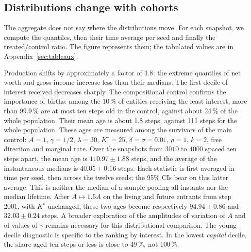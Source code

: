 \subsection{Distributions change with cohorts}\label{sec:ou}
The aggregate does not say where the distributions move. For each
snapshot, we compute the quantiles, then their time average per seed
and finally the treated/control ratio. The figure represents them; the
tabulated values are in Appendix~\ref{sec:tableaux}.


Production shifts by approximately a factor of 1.8; the extreme
quantiles of net worth and gross income increase less than their
medians. The first decile of interest received decreases sharply. The
compositional control confirms the importance of births: among the
10\,\% of entities receiving the least interest, more than 99.9\,\% are
at most ten steps old in the control, against about 24\,\% of the whole
population. Their mean age is about 1.8 steps, against 111 steps for
the whole population. These ages are measured among the survivors of
the main control: $A=1$, $\gamma=1/2$, $\lambda=30$, $K^\circ=25$,
$\delta=\sigma=0.01$, $\rho=1$, $k=2$, free direction and marginal rate.
Over the snapshots from $3010$ to $4000$ spaced ten steps apart, the
mean age is $110.97\pm1.88$ steps, and the average of the instantaneous
medians is $40.05\pm0.16$ steps. Each statistic is first averaged in
time per seed, then across the twelve seeds; the 95\% CIs bear on this
latter average. This is neither the median of a sample pooling all
instants nor the median lifetime. After $A\mapsto1.5A$ on the living
and future entrants from step 2001, with $K^\circ$ unchanged, these two
ages become respectively $94.94\pm0.86$ and $32.03\pm0.24$ steps. A
broader exploration of the amplitudes of variation of $A$ and of values
of $\gamma$ remains necessary for this distributional comparison. The
young-decile diagnostic is specific to the ranking by interest. In the
lowest \emph{capital} decile, the share aged ten steps or less is close
to 49\,\%, not 100\,\%.

